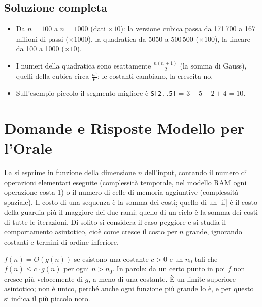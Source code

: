 \subsection*{Soluzione completa}

\begin{consiglio}
\begin{itemize}
  \item Da $n = 100$ a $n = 1000$ (dati $\times 10$): la versione cubica passa da
        171\,700 a 167 milioni di passi ($\times 1000$), la quadratica da 5050 a
        500\,500 ($\times 100$), la lineare da 100 a 1000 ($\times 10$).
  \item I numeri della quadratica sono esattamente $\frac{n(n+1)}{2}$ (la somma di
        Gauss), quelli della cubica circa $\frac{n^3}{6}$: le costanti cambiano, la
        crescita no.
  \item Sull'esempio piccolo il segmento migliore è \texttt{S[2..5]} =
        $3 + 5 - 2 + 4 = 10$.
\end{itemize}
\end{consiglio}

\section{Domande e Risposte Modello per l'Orale}

\begin{orale}
La si esprime in funzione della dimensione $n$ dell'input, contando il numero di
operazioni elementari eseguite (complessità temporale, nel modello RAM ogni
operazione costa 1) o il numero di celle di memoria aggiuntive (complessità
spaziale). Il costo di una sequenza è la somma dei costi; quello di un
\cc|if| è il costo della guardia più il maggiore dei due rami; quello di un ciclo è
la somma dei costi di tutte le iterazioni. Di solito si considera il caso peggiore e
si studia il comportamento asintotico, cioè come cresce il costo per $n$ grande,
ignorando costanti e termini di ordine inferiore.
\end{orale}

\begin{orale}
$f(n) = O(g(n))$ se esistono una costante $c > 0$ e un $n_0$ tali che
$f(n) \le c \cdot g(n)$ per ogni $n > n_0$. In parole: da un certo punto in poi $f$
non cresce più velocemente di $g$, a meno di una costante. È un limite superiore
asintotico; non è unico, perché anche ogni funzione più grande lo è, e per questo si
indica il più piccolo noto.
\end{orale}

